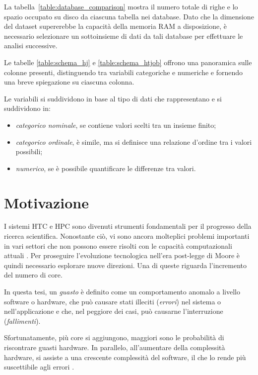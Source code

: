 La tabella~\ref{table:database_comparison} mostra il numero totale di righe e
lo spazio occupato su disco da ciascuna tabella nei database. Dato che la
dimensione del dataset supererebbe la capacità della memoria RAM a
disposizione, è necessario selezionare un sottoinsieme di dati da tali
database per effettuare le analisi successive.

Le tabelle \ref{table:schema_hj} e \ref{table:schema_htjob} offrono una
panoramica sulle colonne presenti, distinguendo tra variabili categoriche e
numeriche e fornendo una breve spiegazione su ciascuna colonna. 

Le variabili si suddividono in base al tipo di dati che rappresentano e si
suddividono in: 

\begin{itemize}
    \item \textit{categorico nominale}, se contiene valori scelti tra un
        insieme finito;
    \item \textit{categorico ordinale}, è simile, ma si definisce una
        relazione d'ordine tra i valori possibili;
    \item \textit{numerico}, se è possibile quantificare le differenze tra valori.
\end{itemize}

\section{Motivazione}

I sistemi HTC e HPC sono divenuti strumenti fondamentali per il progresso
della ricerca scientifica. Nonostante ciò, vi sono ancora molteplici problemi
importanti in vari settori che non possono essere risolti con le capacità
computazionali attuali \cite{Villa2014}. Per proseguire l'evoluzione
tecnologica nell'era post-legge di Moore \cite{Shalf2015, Theis2017} è quindi
necessario esplorare nuove direzioni. Una di queste riguarda l'incremento del
numero di core.

In questa tesi, un \textit{guasto} è definito come un comportamento anomalo a
livello software o hardware, che può causare stati illeciti (\textit{errori})
nel sistema o nell'applicazione e che, nel peggiore dei casi, può causarne
l'interruzione (\textit{fallimenti}).

Sfortunatamente, più core si aggiungono, maggiori sono le probabilità di
riscontrare guasti hardware. In parallelo, all'aumentare della complessità
hardware, si assiste a una crescente complessità del software, il che lo rende
più suscettibile agli errori \cite{Cappello2014}.

